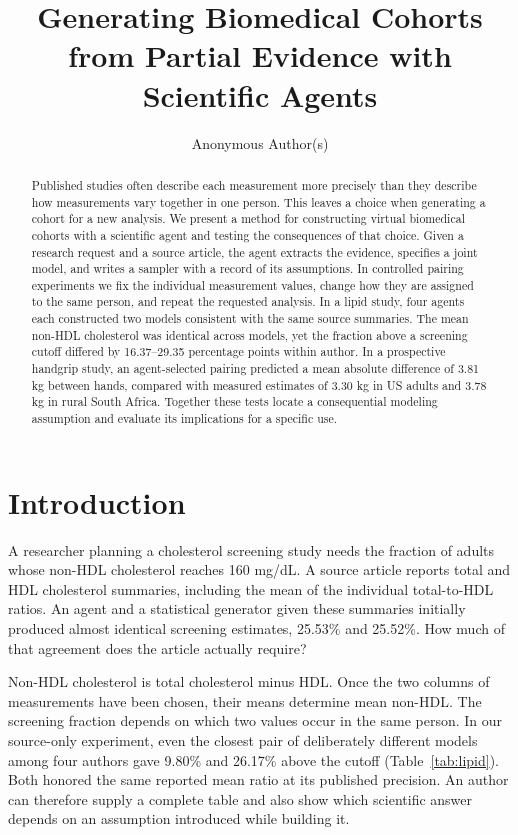 \documentclass[sigconf,anonymous,nonacm]{acmart}
\begin{document}
\title{Generating Biomedical Cohorts from Partial Evidence with Scientific Agents}
\author{Anonymous Author(s)}

\begin{abstract}
Published studies often describe each measurement more precisely than they describe how measurements vary together in one person. This leaves a choice when generating a cohort for a new analysis. We present a method for constructing virtual biomedical cohorts with a scientific agent and testing the consequences of that choice. Given a research request and a source article, the agent extracts the evidence, specifies a joint model, and writes a sampler with a record of its assumptions. In controlled pairing experiments we fix the individual measurement values, change how they are assigned to the same person, and repeat the requested analysis. In a lipid study, four agents each constructed two models consistent with the same source summaries. The mean non-HDL cholesterol was identical across models, yet the fraction above a screening cutoff differed by 16.37--29.35 percentage points within author. In a prospective handgrip study, an agent-selected pairing predicted a mean absolute difference of 3.81 kg between hands, compared with measured estimates of 3.30 kg in US adults and 3.78 kg in rural South Africa. Together these tests locate a consequential modeling assumption and evaluate its implications for a specific use.
\end{abstract}
\maketitle
\raggedbottom
\pagestyle{empty}
\thispagestyle{empty}

\section{Introduction}
A researcher planning a cholesterol screening study needs the fraction of adults whose non-HDL cholesterol reaches 160 mg/dL. A source article reports total and HDL cholesterol summaries, including the mean of the individual total-to-HDL ratios. An agent and a statistical generator given these summaries initially produced almost identical screening estimates, 25.53\% and 25.52\%. How much of that agreement does the article actually require?

Non-HDL cholesterol is total cholesterol minus HDL. Once the two columns of measurements have been chosen, their means determine mean non-HDL. The screening fraction depends on which two values occur in the same person. In our source-only experiment, even the closest pair of deliberately different models among four authors gave 9.80\% and 26.17\% above the cutoff (Table~\ref{tab:lipid}). Both honored the same reported mean ratio at its published precision. An author can therefore supply a complete table and also show which scientific answer depends on an assumption introduced while building it.
\end{document}
